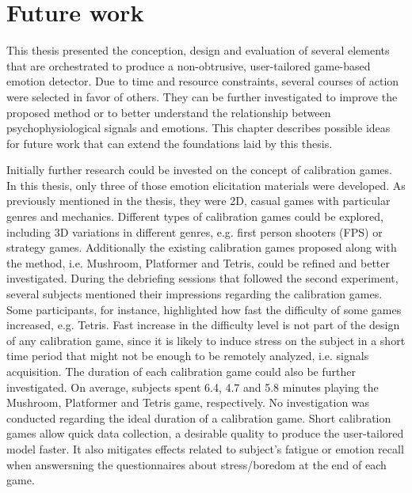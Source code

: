 \chapter{Future work}
\label{ch:closing}

This thesis presented the conception, design and evaluation of several elements that are orchestrated to produce a non-obtrusive, user-tailored game-based emotion detector. Due to time and resource constraints, several courses of action were selected in favor of others. They can be further investigated to improve the proposed method or to better understand the relationship between psychophysiological signals and emotions. This chapter describes possible ideas for future work that can extend the foundations laid by this thesis.

Initially further research could be invested on the concept of calibration games. In this thesis, only three of those emotion elicitation materials were developed. As previously mentioned in the thesis, they were 2D, casual games with particular genres and mechanics. Different types of calibration games could be explored, including 3D variations in different genres, e.g. first person shooters (FPS) or strategy games. Additionally the existing calibration games proposed along with the method, i.e. Mushroom, Platformer and Tetris, could be refined and better investigated. During the debriefing sessions that followed the second experiment, several subjects mentioned their impressions regarding the calibration games. Some participants, for instance, highlighted how fast the difficulty of some games increased, e.g. Tetris. Fast increase in the difficulty level is not part of the design of any calibration game, since it is likely to induce stress on the subject in a short time period that might not be enough to be remotely analyzed, i.e. signals acquisition. The duration of each calibration game could also be further investigated. On average, subjects spent 6.4, 4.7 and 5.8 minutes playing the Mushroom, Platformer and Tetris game, respectively. No investigation was conducted regarding the ideal duration of a calibration game. Short calibration games allow quick data collection, a desirable quality to produce the user-tailored model faster. It also mitigates effects related to subject's fatigue or emotion recall when answersning the questionnaires about stress/boredom at the end of each game.

